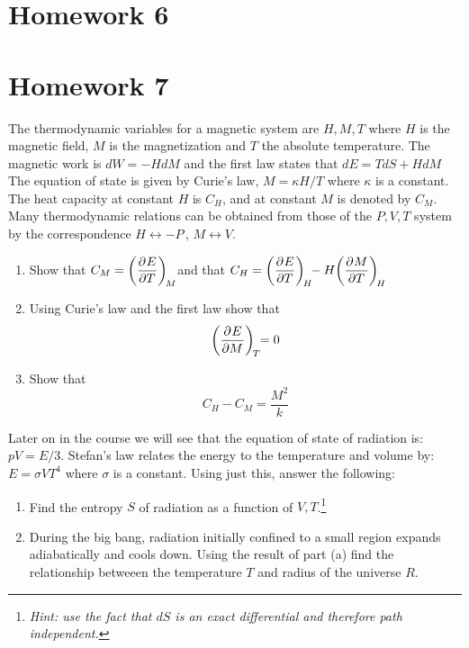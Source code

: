\documentclass{article}
\begin{document}
\section{Homework 6}
    \begin{problem}[Reif 5.15]
        \answerline
    \end{problem}\newpage
    \begin{problem}[Reif 5.17]
        \answerline
    \end{problem}\newpage
    \begin{problem}[Reif 5.23]
        \answerline
    \end{problem}\newpage
\section{Homework 7}
    \begin{problem}[Reif 5.26]
        \answerline
    \end{problem}\newpage
    \begin{problem}
        The thermodynamic variables for a magnetic system are $H,M,T$ where $H$ is the magnetic field, $M$ is the magnetization and $T$ the absolute temperature. The magnetic work is $dW = -HdM$ and the first law
        states that $dE=TdS+HdM$ The equation of state is given by Curie's law, $M=\kappa H/T$ where $\kappa$ is a constant. The heat capacity at constant $H$ is $C_H$, and at constant $M$ is denoted by $C_M$. Many
        thermodynamic relations can be obtained from those of the $P,V,T$ system by the correspondence $H \leftrightarrow -P\,,\, M\leftrightarrow V$.
        \begin{enumerate}[label=(\alph*)]
            \item Show that $\displaystyle C_M=\pder{E}{T}[M]$ and that $\displaystyle C_H=\pder{E}{T}[H]-H\pder{M}{T}[H]$
            \item Using Curie's law and the first law show that $$\pder{E}{M}[T]=0$$
            \item Show that $$C_H-C_M=\frac{M^2}{k}$$
        \end{enumerate}
    \end{problem}\newpage
    \begin{problem}
        Later on in the course we will see that the equation of state of radiation is: $pV=E/3$. Stefan's law relates the energy to the temperature and
        volume by: $E=\sigma VT^4$ where $\sigma$ is a constant. Using just this, answer the following:
        \begin{enumerate}[label=(\alph*)]
            \item Find the entropy $S$ of radiation as a function of $V,T$.\footnote{\textit{Hint: use the fact that $dS$ is an exact differential and therefore path independent.}}
            \item During the big bang, radiation initially confined to a small region expands adiabatically and cools down. Using the result of part (a) find the relationship betweeen the temperature $T$ and radius of the universe $R$.
        \end{enumerate}
    \end{problem}
\end{document}

